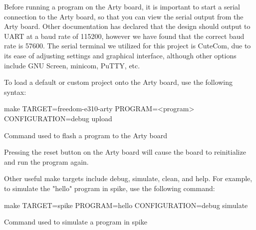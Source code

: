 	 Before running a program on the Arty board, it is important to start a serial connection to the Arty board, so that you can view the serial output from the Arty board. Other documentation has declared that the design should output to UART at a baud rate of 115200, however we have found that the correct baud rate is 57600. The serial terminal we utilized for this project is CuteCom\cite{CuteCom}, due to its ease of adjusting settings and graphical interface, although other options include GNU Screen, minicom, PuTTY, etc.
	
	 To load a default or custom project onto the Arty board, use the following syntax:

	\begin{listing}[h!tbp]
		\begin{bashsource}
			make TARGET=freedom-e310-arty PROGRAM=<program> CONFIGURATION=debug upload
		\end{bashsource}
		\caption{Command used to flash a program to the Arty board}
		\label{lst:upload_to_arty}
	\end{listing}
	
	Pressing the reset button on the Arty board will cause the board to reinitialize and run the program again.
	
	Other useful make targets include debug, simulate, clean, and help. For example, to simulate the "hello" program in \gls{spike}\cite{SpikeSimulator}, use the following command:

	\begin{listing}[h!tbp]
		\begin{bashsource}
			make TARGET=spike PROGRAM=hello CONFIGURATION=debug simulate
		\end{bashsource}
		\caption{Command used to simulate a program in \gls{spike}}
		\label{lst:simulate_in_spike}
	\end{listing}
	

